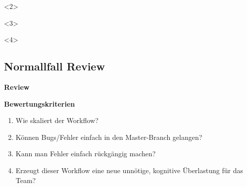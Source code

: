 \begin{frame}[c, fragile]
\begin{center}
\begin{onlyenv}
            \vspace{1em}

            \begin{onlyenv}<2>
            \end{onlyenv}
            \begin{onlyenv}<3>
            \end{onlyenv}
            \begin{onlyenv}<4>
            \end{onlyenv}
            \vspace{-1em}
        \end{onlyenv}
    \end{center}
\end{frame}

\subsection{Normallfall Review}\label{subsec:normallfall-review}
\begin{frame}[c]
    \slidehead
    \centering
    \Large
    \textbf{Review}
\end{frame}

\begin{frame}[c]
    \slidehead
    \large
    \textbf{Bewertungskriterien}
    \normalsize
    \begin{enumerate}
        \item<2-> Wie skaliert der Workflow? 
        \item<4-> Können Bugs/Fehler einfach in den Master-Branch gelangen? 
        \item<6-> Kann man Fehler einfach rückgängig machen? 
        \item<8-> Erzeugt dieser Workflow eine neue unnötige, kognitive Überlastung für das Team? 
    \end{enumerate}
\end{frame}

